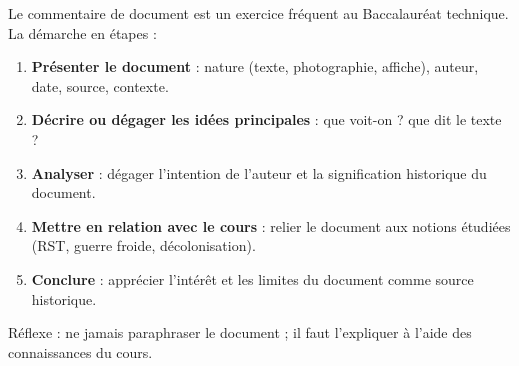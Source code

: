 \documentclass[11pt]{article}
\newcommand{\cle}[1]{{\popxbold\color{popdark}#1}}
\begin{document}
\begin{methode}
Le commentaire de document est un exercice fréquent au Baccalauréat technique. La démarche en étapes :
\begin{enumerate}
\item \textbf{Présenter le document} : nature (texte, photographie, affiche), auteur, date, source, contexte.
\item \textbf{Décrire ou dégager les idées principales} : que voit-on ? que dit le texte ?
\item \textbf{Analyser} : dégager l'intention de l'auteur et la signification historique du document.
\item \textbf{Mettre en relation avec le cours} : relier le document aux notions étudiées (RST, guerre froide, décolonisation).
\item \textbf{Conclure} : apprécier l'intérêt et les limites du document comme source historique.
\end{enumerate}
Réflexe : ne jamais paraphraser le document ; il faut l'\cle{expliquer} à l'aide des connaissances du cours.
\end{methode}
\end{document}
